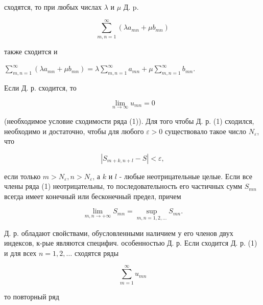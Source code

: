 \documentclass[10pt]{article}
\begin{document}
сходятся, то при любых числах $\lambda$ и $\mu$ Д. p.



\[

\sum_{m, n=1}^{\infty}\left(\lambda a_{m n}+\mu b_{m n}\right)

\]



также сходится и



$\sum_{m, n=1}^{\infty}\left(\lambda a_{m n}+\mu b_{m n}\right)=\lambda \sum_{m, n=1}^{\infty} a_{m n}+\mu \sum_{m, n=1}^{\infty} b_{m n}$.



Если Д. р. сходится, то



\[

\lim _{n \rightarrow \infty} u_{m n}=0

\]



(необходимое условие сходимости ряда (1)). Для того чтобы Д. р. (1) сходился, необходимо и достаточно, чтобы для любого $\varepsilon>0$ существовало такое число $N_{\varepsilon}$, что



\[

\left|S_{m+k, n+l}-S\right|<\varepsilon,

\]



если только $m>N_{\varepsilon}, n>N_{\varepsilon}$, а $k$ и $l$ - любые неотрицательные целые. Если все члены ряда (1) неотрицательны, то последовательность его частичных сумм $S_{m n}$ всегда имеет конечный или бесконечный предел, причем



\[

\lim _{m, n \rightarrow+\infty} S_{m n}=\sup _{m, n=1,2, \ldots} S_{m n} .

\]



Д. р. обладают свойствами, обусловленными наличием у его членов двух индексов, к-рые являются специфич. особенностью Д. р. Если сходится Д. р. (1) и для всех $n=1,2, \ldots$ сходятся ряды



\[

\sum_{m=1}^{\infty} u_{m n}

\]



то повторный ряд
\end{document}
